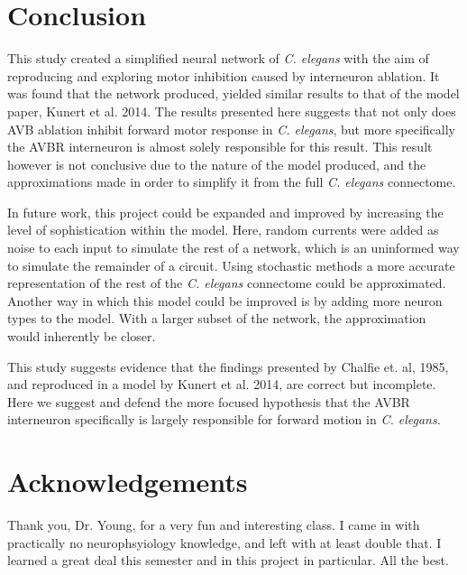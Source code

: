\documentclass[11pt]{article} %
\begin{document}
\section{Conclusion}
This study created a simplified neural network of \emph{C. elegans} with the aim of reproducing and exploring motor inhibition caused by interneuron ablation. It was found that the network produced, yielded similar results to that of the model paper, Kunert et al. 2014. The results presented here suggests that not only does AVB ablation inhibit forward motor response in \emph{C. elegans}, but more specifically the AVBR interneuron is almost solely responsible for this result. This result however is not conclusive due to the nature of the model produced, and the approximations made in order to simplify it from the full \emph{C. elegans} connectome.

In future work, this project could be expanded and improved by increasing the level of sophistication within the model. Here, random currents were added as noise to each input to simulate the rest of a network, which is an uninformed way to simulate the remainder of a circuit. Using stochastic methods \cite{Iwasaki2006} a more accurate representation of the rest of the \emph{C. elegans} connectome could be approximated. Another way in which this model could be improved is by adding more neuron types to the model. With a larger subset of the network, the approximation would inherently be closer.

This study suggests evidence that the findings presented by Chalfie et. al, 1985, and reproduced in a model by Kunert et al. 2014, are correct but incomplete. Here we suggest and defend the more focused hypothesis that the AVBR interneuron specifically is largely responsible for forward motion in \emph{C. elegans}.

\section{Acknowledgements}
Thank you, Dr. Young, for a very fun and interesting class. I came in with practically no neurophsyiology knowledge, and left with at least double that. I learned a great deal this semester and in this project in particular. All the best.
\clearpage
{}

\end{document}
